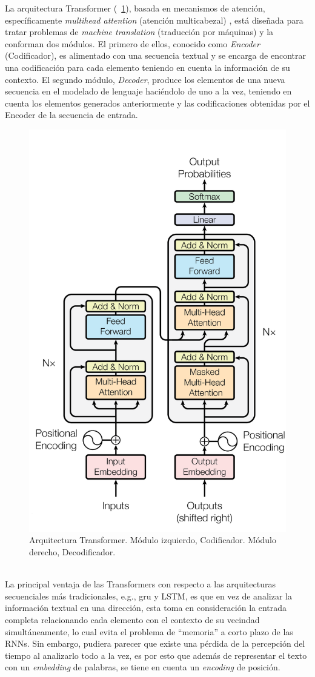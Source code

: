 	La arquitectura Transformer (\figurename~\ref{transformer}), basada en mecanismos de atención, específicamente \textit{multihead attention} (atención multicabezal) \citep{vaswani2017attention}, está diseñada para tratar problemas de \textit{machine translation} (traducción por máquinas) y la conforman dos módulos. El primero de ellos, conocido como \textit{Encoder} (Codificador), es alimentado con una secuencia textual y se encarga de encontrar una codificación para cada elemento teniendo en cuenta la información de su contexto. El segundo módulo, \textit{Decoder}, produce los elementos de una nueva secuencia en el modelado de lenguaje haciéndolo de uno a la vez, teniendo en cuenta los elementos generados anteriormente y las codificaciones obtenidas por el Encoder de la secuencia de entrada.
	\begin{figure}[!thb]
		\vspace{-5mm}
		\begin{center}
			\includegraphics[width=.47\linewidth, height=.47\textheight]{images/transformer.png}
			\vspace{-5mm}
		\end{center}
		\caption[Arquitectura Transformer]{Arquitectura Transformer. Módulo izquierdo, Codificador. Módulo derecho, Decodificador. \citep{vaswani2017attention} }
		\label{transformer}
	\end{figure}
		\\
	La principal ventaja de las Transformers con respecto a las arquitecturas secuenciales más tradicionales, e.g., \ac{gru} y LSTM, es que en vez de analizar la información textual en una dirección, esta toma en consideración la entrada completa relacionando cada elemento con el contexto de su vecindad simultáneamente, lo cual evita el problema de ``memoria'' a corto plazo de las RNNs. Sin embargo, pudiera parecer que existe una pérdida de la percepción del tiempo al analizarlo todo a la vez, es por esto que además de representar el texto con un \textit{embedding} de palabras, se tiene en cuenta un \textit{encoding} de posición. 
